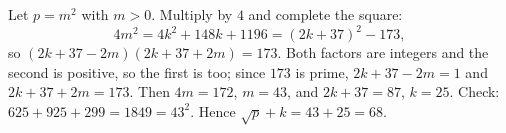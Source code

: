 Let $p=m^2$ with $m>0$. Multiply by $4$ and complete the square:
\[
4m^2=4k^2+148k+1196=(2k+37)^2-173 ,
\]
so $(2k+37-2m)(2k+37+2m)=173$. Both factors are integers and the second is positive, so the first is too; since $173$ is prime, $2k+37-2m=1$ and $2k+37+2m=173$. Then $4m=172$, $m=43$, and $2k+37=87$, $k=25$. Check: $625+925+299=1849=43^2$. Hence $\sqrt p+k=43+25=\boxed{68}$.
